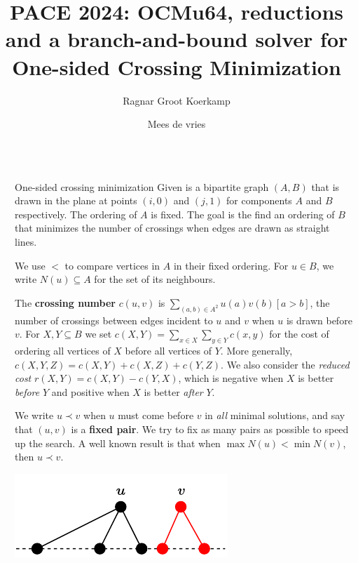 \documentclass[final]{beamer}
\title{PACE 2024: OCMu64, reductions and a branch-and-bound solver for\\ One-sided Crossing Minimization}
\author{Ragnar {Groot Koerkamp} \inst{1} \and Mees de vries \inst{2}}
\institute[shortinst]{\inst{1} ETH Zurich, @curious\_coding \samelineand
  \inst{2} Unaffiliated, The Netherlands}
\newlength{\sepwidth}
\newlength{\colwidth}
\newcommand{\separatorcolumn}{\begin{column}{\sepwidth}\end{column}}
\theoremstyle{remark}
\renewcommand{\b}{\prec}
\begin{document}


\begin{frame}[t]
  \begin{columns}[t]
    \separatorcolumn
    \begin{column}{\colwidth}

      \begin{block}{One-sided crossing minimization}
        Given is a bipartite graph $(A, B)$ that is drawn in the plane at points
        $(i, 0)$ and $(j,1)$ for components $A$ and $B$ respectively. The ordering of $A$
        is fixed. The goal is the find an ordering of $B$ that minimizes the number of
        crossings when edges are drawn as straight lines.

        We use $<$ to compare vertices in $A$ in their fixed ordering.
        For $u\in B$, we write $N(u) \subseteq A$ for the set of its neighbours.

        The \textbf{crossing number} $c(u, v)$ is $\sum_{(a, b) \in A^2}
        u(a)v(b)[a > b]$, the number of
        crossings between edges incident to $u$ and $v$ when $u$ is drawn before $v$.  For
        $X,Y\subseteq B$ we set $c(X,Y) = \sum_{x\in X}\sum_{y\in Y} c(x,y)$ for the cost of ordering
        all vertices of $X$ before all vertices of $Y$. More generally, $c(X,Y,Z) = c(X, Y) + c(X, Z) +
        c(Y, Z)$. We also consider the \emph{reduced cost} $r(X,Y) = c(X, Y) - c(Y, X)$, which is
        negative when $X$ is better \emph{before} $Y$ and positive when $X$ is better \emph{after} $Y$.

        We write $u\b v$ when $u$ must come before $v$ in \emph{all} minimal solutions, and say that $(u, v)$
        is a \textbf{fixed pair}.
        We try to fix as many pairs as possible to speed up the search.
        A well known result is that when $\max N(u) < \min N(v)$, then $u\b v$.

        \vspace{-1.5em}
        \centering
        \includegraphics[scale=2]{fig/simple.pdf}
      \end{block}


\end{column}
\end{columns}
\end{frame}
\end{document}
